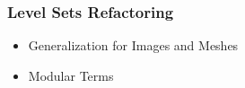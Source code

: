 
\begin{frame}
\frametitle{Level Sets Refactoring}
\Huge
\begin{itemize}
\item Generalization for Images and Meshes
\pause
\item Modular Terms
\end{itemize}
\end{frame}

